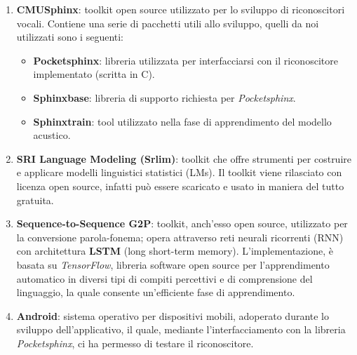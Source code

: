 \documentclass[12pt]{article}
\begin{document}
    \begin{enumerate}
    
        \item \textbf{CMUSphinx}: toolkit open source utilizzato per lo sviluppo di riconoscitori vocali. Contiene una serie di pacchetti utili allo sviluppo, quelli da noi utilizzati sono i seguenti:
         \begin{itemize}         
            \item \textbf{Pocketsphinx}: libreria utilizzata per interfacciarsi con il riconoscitore implementato (scritta in C).
            \item \textbf{Sphinxbase}: libreria di supporto richiesta per \textit{Pocketsphinx}. 
            \item \textbf{Sphinxtrain}: tool utilizzato nella fase di apprendimento del modello acustico.
        \end{itemize}
        
        \item \textbf{SRI Language Modeling (Srlim)}: toolkit che offre strumenti per costruire e applicare modelli linguistici statistici (LMs). Il toolkit viene rilasciato con licenza open source, infatti può essere scaricato e usato in maniera del tutto gratuita.
        
        \item \textbf{Sequence-to-Sequence G2P}: toolkit, anch'esso open source, utilizzato per la conversione parola-fonema; opera attraverso reti neurali ricorrenti (RNN) con architettura \textbf{LSTM} (long short-term memory). L'implementazione, è basata su \textit{TensorFlow}, libreria software open source per l'apprendimento automatico in diversi tipi di compiti percettivi e di comprensione del linguaggio, la quale consente un'efficiente fase di apprendimento.
        
        \item \textbf{Android}: sistema operativo per dispositivi mobili, adoperato durante lo sviluppo dell'applicativo, il quale, mediante l'interfacciamento con la libreria \textit{Pocketsphinx}, ci ha permesso di testare il riconoscitore.
    
    \end{enumerate}
  
\newpage
\end{document}
